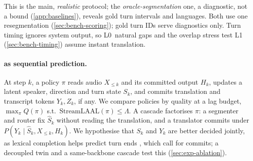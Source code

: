 This is the main, \emph{realistic} protocol; the \emph{oracle-segmentation} one, a diagnostic, not a bound (\cref{app:baselines}), reveals gold turn intervals and languages. Both use one resegmentation (\cref{sec:bench-scoring}); gold turn IDs serve diagnostics only. Turn timing ignores system output, so L0~natural gaps and the overlap stress test L1 (\cref{sec:bench-timing}) assume instant translation.

\paragraph{\task as sequential prediction.}
At step $k$, a policy $\pi$ reads audio $X_{\le k}$ and its committed output $H_k$, updates a latent speaker, direction and turn state $S_k$, and commits translation and transcript tokens $Y_k,Z_k$, if any. We compare policies by quality at a lag budget, $\max_\pi Q(\pi)$ s.t.\ $\mathrm{StreamLAAL}(\pi)\le\Lambda$. A cascade factorises $\pi$: a segmenter and router fix $\hat S_k$ without reading the translation, and a translator commits under $P(Y_k\mid\hat S_k,X_{\le k},H_k)$. We hypothesise that $S_k$ and $Y_k$ are better decided jointly, as lexical completion helps predict turn ends \citep{ekstedt2020turngpt}, which call for commits; a decoupled twin and a same-backbone cascade test this (\cref{sec:exp-ablation}).
